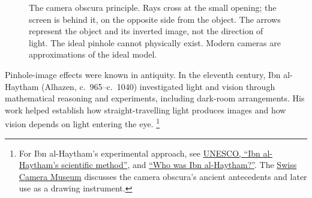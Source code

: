 \begin{figure}[htbp]\centering
{}
\caption{The camera obscura principle. Rays cross at the small opening;
the screen is behind it, on the opposite side from the object. The arrows
represent the object and its inverted image, not the direction of light. The ideal pinhole cannot physically exist. Modern cameras are approximations of the ideal model.}
\label{fig:geo-pinhole}
\end{figure}

Pinhole-image effects were known in antiquity. In the eleventh century,
Ibn al-Haytham (Alhazen, c.~965--c.~1040) investigated light and vision
through mathematical reasoning and experiments, including dark-room
arrangements. His work helped establish how straight-travelling light
produces images and how vision depends on light entering the eye. \footnote{For Ibn al-Haytham's experimental approach, see
\href{https://www.unesco.org/en/articles/ibn-al-haythams-scientific-method}{UNESCO, ``Ibn al-Haytham's scientific method''}, and
\href{https://www.ibnalhaytham.com/discover/who-was-ibn-al-haytham/}{``Who was Ibn al-Haytham?''}.
The \href{https://www.cameramuseum.ch/en/discover/permanent-exhibition/the-origins-of-photography/the-camera-obscura/}{Swiss Camera Museum}
discusses the camera obscura's ancient antecedents and later use as a drawing instrument.}


